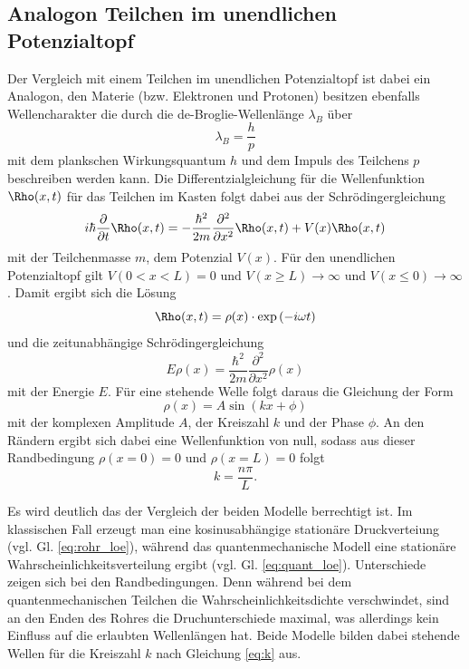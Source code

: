 \subsection{Analogon Teilchen im unendlichen Potenzialtopf}
Der Vergleich mit einem Teilchen im unendlichen Potenzialtopf ist dabei ein Analogon, 
den Materie (bzw. Elektronen und Protonen) besitzen ebenfalls Wellencharakter die durch die de-Broglie-Wellenlänge $\lambda_B$ über
\begin{equation}
    \lambda_B=\frac{h}{p}
\end{equation}
mit dem plankschen Wirkungsquantum $h$ und dem Impuls des Teilchens $p$ beschreiben werden kann.
Die Differentzialgleichung für die Wellenfunktion $\Rho(x,t)$ für das Teilchen im Kasten folgt dabei aus der Schrödingergleichung
\begin{equation}
    i\hbar \frac{\partial}{\partial t}\Rho(x,t)=-\frac{\hbar^2}{2m}\frac{\partial^2}{\partial x^2}\Rho(x,t)+V(x)\Rho(x,t)
\end{equation}
mit der Teilchenmasse $m$, dem Potenzial $V(x)$. Für den unendlichen Potenzialtopf gilt $V(0 < x < L)=0$ und
$V(x \geq L)\rightarrow \infty$ und $V(x \leq 0)\rightarrow \infty$.
Damit ergibt sich die Lösung
\begin{equation}
    \Rho(x,t)=\rho(x)\cdot \exp{(-i\omega t)}
\end{equation}
und die zeitunabhängige Schrödingergleichung
\begin{equation}
    E\rho(x)=\frac{\hbar^2}{2m}\frac{\partial^2}{\partial x^2}\rho(x)
\end{equation}
mit der Energie $E$.
Für eine stehende Welle folgt daraus die Gleichung der Form
\begin{equation}
    \rho(x)=A\sin{(kx+\phi)}
    \label{eq:quant_loe}
\end{equation}
mit der komplexen Amplitude $A$, der Kreiszahl $k$ und der Phase $\phi$.
An den Rändern ergibt sich dabei eine Wellenfunktion von null, sodass aus dieser Randbedingung
$\rho(x=0)=0$ und $\rho(x=L)=0$ folgt
\begin{equation}
    k=\frac{n\pi}{L}.
    \label{eq:k}
\end{equation} 

Es wird deutlich das der Vergleich der beiden Modelle berrechtigt ist. Im klassischen Fall erzeugt man eine kosinusabhängige stationäre
Druckverteiung (vgl. Gl. \ref{eq:rohr_loe}), während das quantenmechanische Modell 
eine stationäre Wahrscheinlichkeitsverteilung ergibt (vgl. Gl. \ref{eq:quant_loe}). Unterschiede zeigen sich bei den Randbedingungen.
Denn während bei dem quantenmechanischen Teilchen die Wahrscheinlichkeitsdichte verschwindet, sind an den Enden des Rohres 
die Druchunterschiede maximal, was allerdings kein Einfluss auf die erlaubten Wellenlängen hat.
Beide Modelle bilden dabei stehende Wellen für die Kreiszahl $k$ nach Gleichung \ref{eq:k} aus.


